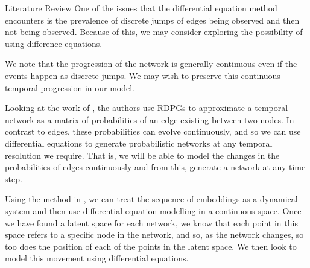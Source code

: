 \documentclass[12pt]{amsart}
\begin{document}
\begin{section}{Literature Review}
        One of the issues that the differential equation method encounters is the prevalence of discrete jumps of edges being observed and then not being observed. Because of this, we may consider exploring the possibility of using difference equations.  
    
        We note that the progression of the network is generally continuous even if the events happen as discrete jumps. We may wish to preserve this continuous temporal progression in our model.
        

        
        Looking at the work of \cite{sanna2021link}, the authors use RDPGs to approximate a temporal network as a matrix of probabilities of an edge existing between two nodes. In contrast to edges, these probabilities can evolve continuously, and so we can use differential equations to generate probabilistic networks at any temporal resolution we require. That is, we will be able to model the changes in the probabilities of edges continuously and from this, generate a network at any time step.

        Using the method in \cite{sanna2021link}, we can treat the sequence of embeddings as a dynamical system and then use differential equation modelling in a continuous space. Once we have found a latent space for each network, we know that each point in this space refers to a specific node in the network, and so, as the network changes, so too does the position of each of the points in the latent space. We then look to model this movement using differential equations. 
        

\end{section}
\end{document}
